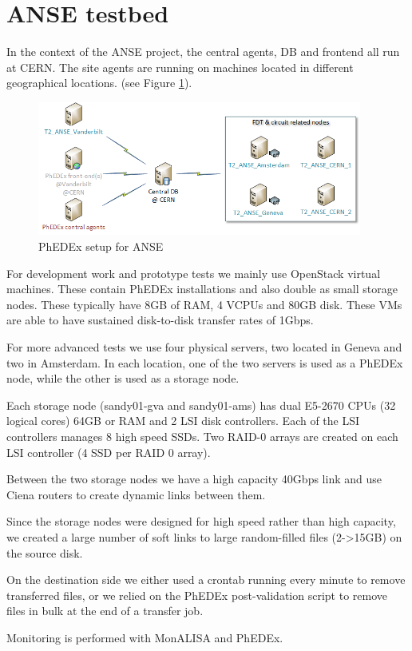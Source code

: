 \section{ANSE testbed}

In the context of the ANSE project, the central agents, DB and frontend all run
at CERN. The site agents are running on machines located in different geographical
locations. (see Figure \ref{fig:ANSE-setup}).

\begin{figure}[h]
  \centering
  \includegraphics[width=0.95\textwidth]{Figures/ANSE-setup.png}
  \caption{PhEDEx setup for ANSE}
  \label{fig:ANSE-setup}
\end{figure}

For development work and prototype tests we mainly use OpenStack virtual machines.
These contain PhEDEx installations and also double as small storage nodes. These
typically have 8GB of RAM, 4 VCPUs and 80GB disk. These VMs are able to have
sustained disk-to-disk transfer rates of 1Gbps.

For more advanced tests we use four physical servers, two located in Geneva and 
two in Amsterdam. In each location, one of the two servers is used as a PhEDEx node, 
while the other is used as a storage node.

Each storage node (sandy01-gva and sandy01-ams) has dual E5-2670 CPUs (32 logical cores)
64GB or RAM and 2 LSI disk controllers. Each of the LSI controllers manages
8 high speed SSDs. Two RAID-0 arrays are created on each LSI controller (4 SSD per
RAID 0 array).

Between the two storage nodes we have a high capacity 40Gbps link and use Ciena
routers to create dynamic links between them.

Since the storage nodes were designed for high speed rather than high capacity,
we created a large number of soft links to large random-filled files (2->15GB) 
on the source disk. 

On the destination side we either used a crontab running every minute to remove
transferred files, or we relied on the PhEDEx post-validation  script to remove 
files in bulk at the end of a transfer job.

Monitoring is performed with MonALISA\cite{MonALISA} and PhEDEx.
